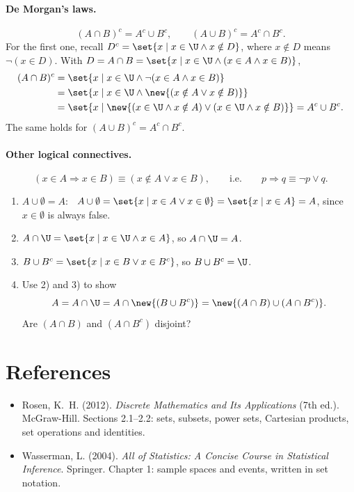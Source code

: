 \paragraph{De Morgan's laws.}
\[
(A \cap B)^c = A^c \cup B^c, \qquad (A \cup B)^c = A^c \cap B^c.
\]
For the first one, recall $D^c = \set{x \mid x \in \U \wedge x \notin D}$, where $x \notin D$ means $\neg(x \in D)$. With $D = A \cap B = \set{x \mid x \in \U \wedge (x \in A \wedge x \in B)}$,
\begin{align*}
(A \cap B)^c &= \set{x \mid x \in \U \wedge \neg(x \in A \wedge x \in B)}\\
&= \set{x \mid x \in \U \wedge \new{(x \notin A \vee x \notin B)}}\\
&= \set{x \mid \new{(x \in \U \wedge x \notin A) \vee (x \in \U \wedge x \notin B)}} = A^c \cup B^c.
\end{align*}
The same holds for $(A \cup B)^c = A^c \cap B^c$.

\paragraph{Other logical connectives.}
\[
(x \in A \Rightarrow x \in B) \equiv (x \notin A \vee x \in B), \qquad\text{i.e.}\qquad p \Rightarrow q \equiv \neg p \vee q.
\]

\begin{exercise}\leavevmode
\begin{enumerate}
\item $A \cup \emptyset = A$: \ $A \cup \emptyset = \set{x \mid x \in A \vee x \in \emptyset} = \set{x \mid x \in A} = A$, since $x \in \emptyset$ is always false.
\item $A \cap \U = \set{x \mid x \in \U \wedge x \in A}$, so $A \cap \U = A$.
\item $B \cup B^c = \set{x \mid x \in B \vee x \in B^c}$, so $B \cup B^c = \U$.
\item Use 2) and 3) to show
\[
A = A \cap \U = A \cap \new{(B \cup B^c)} = \new{(A \cap B) \cup (A \cap B^c)}.
\]
Are $(A \cap B)$ and $(A \cap B^c)$ disjoint?
\end{enumerate}
\end{exercise}

\section*{References}
\begin{itemize}
\item Rosen, K.~H. (2012). \emph{Discrete Mathematics and Its Applications} (7th ed.). McGraw-Hill. Sections 2.1--2.2: sets, subsets, power sets, Cartesian products, set operations and identities.
\item Wasserman, L. (2004). \emph{All of Statistics: A Concise Course in Statistical Inference}. Springer. Chapter 1: sample spaces and events, written in set notation.
\end{itemize}


